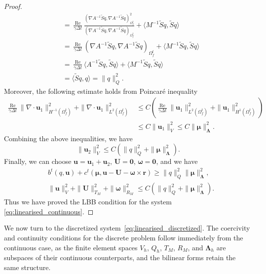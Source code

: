 \documentclass{article}
\newcommand{\bU}{{\mathbf{U}}}
\newcommand{\bu}{{\mathbf{u}}}
\newcommand{\bomega}{{\boldsymbol{\omega}}}
\newcommand{\Reynolds}{{\operatorname{Re}}}
\begin{document}
\begin{proof}
\begin{equation}
\begin{aligned}
            & = \frac{\Reynolds}{\gamma\Delta t}\frac{(\nabla A^{-1}\tilde{S}q,\nabla  A^{-1}\tilde{S}q)_{\Omega_f^t}^2}{(\nabla  A^{-1}\tilde{S}q,\nabla  A^{-1}\tilde{S}q)_{\Omega_f^t}} + \langle M^{-1}\tilde{S}q,\tilde{S}q\rangle\\
            &= \frac{\Reynolds}{\gamma\Delta t}(\nabla  A^{-1}\tilde{S}q,\nabla  A^{-1}\tilde{S}q)_{\Omega_f^t} + \langle M^{-1}\tilde{S}q,\tilde{S}q\rangle\\
            &= \frac{\Reynolds}{\gamma\Delta t}\langle A^{-1}\tilde{S}q, \tilde{S}q\rangle + \langle M^{-1}\tilde{S}q,\tilde{S}q\rangle\\
            &= \langle \tilde{S}q,q\rangle = \|q\|_Q^2.
        \end{aligned}
    \end{equation}
    Moreover, the following estimate holds from Poincar\'e inequality
    \begin{equation}
        \begin{aligned}
        \frac{\Reynolds}{\gamma\Delta t}\|\nabla\cdot \bu_1\|_{H^{-1}(\Omega_f^t)}^2 + \|\nabla\cdot \bu_1\|_{L^2(\Omega_f^t)}^2 &\leq C(\frac{\Reynolds}{\gamma\Delta t}\|\bu_1\|_{L^2(\Omega_f^t)}^2 + \|\bu_1\|_{H^1(\Omega_f^t)}^2)\\
        &\leq C\|\bu_1\|_V^2\leq C\|\boldsymbol{\mu}\|_{\boldsymbol{\Lambda}}^2.
        \end{aligned}
    \end{equation}
    Combining the above inequalities, we have
    \begin{equation}
        \|\bu_2\|_V^2 \leq C (\|{q}\|_Q^2 + \|{\boldsymbol{\mu}}\|_{\boldsymbol{\Lambda}}^2).
    \end{equation}
    Finally, we can choose $\bu = \bu_1 + \bu_2$, ${\bU} = \mathbf{0}$, ${\bomega} = \mathbf{0}$, and we have
    \begin{equation}
        \begin{aligned}
            &{b}^t({q},\bu)+{c}^t({\boldsymbol{\mu}},\bu - {\bU} - {\bomega}\times\mathbf{r}) \geq \|{q}\|_Q^2\|{\boldsymbol{\mu}}\|_{\boldsymbol{\Lambda}}^2,\\
            &\|\bu\|_V^2 + \|{\bU}\|_{T_M}^2 + \|{\bomega}\|_{R_M}^2 \leq C(\|{q}\|_Q^2 + \|{\boldsymbol{\mu}}\|_{\boldsymbol{\Lambda}}^2).
        \end{aligned}
    \end{equation}
    Thus we have proved the LBB condition for the system \eqref{eq:linearised_continuous}.
\end{proof}
We now turn to the discretized system~\eqref{eq:linearised_discretized}. 
The coercivity and continuity conditions for the discrete problem follow immediately from the continuous case, as the finite element spaces $V_h$, $Q_h$, $T_M$, $R_M$, and $\boldsymbol{\Lambda}_h$ are subspaces of their continuous counterparts, and the bilinear forms retain the same structure. 
\end{document}
